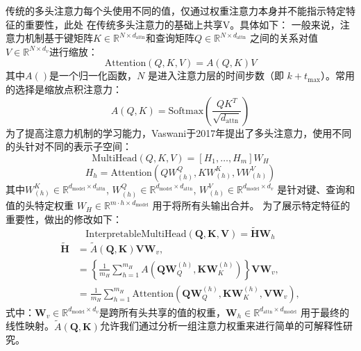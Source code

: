 传统的多头注意力每个头使用不同的值，仅通过权重注意力本身并不能指示特定特征的重要性，此处
在传统多头注意力的基础上共享V。具体如下：
一般来说，注意力机制基于键矩阵\( K \in \mathbb{R}^{N \times d_{\text{attn}}} \)和查询矩阵\( Q \in \mathbb{R}^{N \times d_{\text{attn}}} \)
之间的关系对值\( V \in \mathbb{R}^{N \times d_v} \)进行缩放：
\begin{equation}
    \text{Attention}(Q, K, V) = A(Q,K)V
\end{equation}
其中$A()$是一个归一化函数，\( N \) 是进入注意力层的时间步数（即 \( k + t_{\text{max}} \)）。常用的选择是缩放点积注意力：
\begin{equation}
    A(Q, K) = \text{Softmax}\left(\frac{QK^T}{\sqrt{d_{\text{attn}}}}\right)
\end{equation}
为了提高注意力机制的学习能力，Vaswani于2017年提出了多头注意力，使用不同的头针对不同的表示子空间：
\begin{equation}
    \text{MultiHead}(Q, K, V) = [H_1, \ldots, H_m]W_H
\end{equation}
\begin{equation}
    H_h = \text{Attention}(QW^Q_{(h)}, KW^K_{(h)}, VW^V_{(h)})
\end{equation}
其中\( W^K_{(h)} \in \mathbb{R}^{d_{\text{model}} \times d_{\text{attn}}} \), \( W^Q_{(h)} \in \mathbb{R}^{d_{\text{model}} \times d_{\text{attn}}} \), \( W^V_{(h)} \in \mathbb{R}^{d_{\text{model}} \times d_v} \) 
是针对键、查询和值的头特定权重 \( W_H \in \mathbb{R}^{m \cdot h \times d_{\text{model}}} \) 用于将所有头输出合并。
为了展示特定特征的重要性，做出的修改如下：
\begin{equation}
    \text{InterpretableMultiHead}(\mathbf{Q}, \mathbf{K}, \mathbf{V}) = \tilde{\mathbf{H}} \mathbf{W}_h
\end{equation}
\begin{equation}
    \begin{aligned}
        \mathbf{\tilde{H}} &= \tilde{A}(\mathbf{Q}, \mathbf{K}) \mathbf{V} \mathbf{W}_v, \\
        &= \left\{ \frac{1}{m_H} \sum_{h=1}^{m_H} A(\mathbf{Q} \mathbf{W}_Q^{(h)}, \mathbf{K} \mathbf{W}_K^{(h)}) \right\} \mathbf{V} \mathbf{W}_v, \\
        &= \frac{1}{m_H} \sum_{h=1}^{m_H} \text{Attention}(\mathbf{Q} \mathbf{W}_Q^{(h)}, \mathbf{K} \mathbf{W}_K^{(h)}, \mathbf{V} \mathbf{W}_v),
    \end{aligned}        
\end{equation}
式中：$\mathbf{W}_v \in \mathbb{R}^{d_{\text{model}} \times d_v}$是跨所有头共享的值的权重，$\mathbf{W}_h \in \mathbb{R}^{d_{\text{attn}} \times d_{\text{model}}}$
用于最终的线性映射。$\tilde{A}(\mathbf{Q}, \mathbf{K})$允许我们通过分析一组注意力权重来进行简单的可解释性研究。

